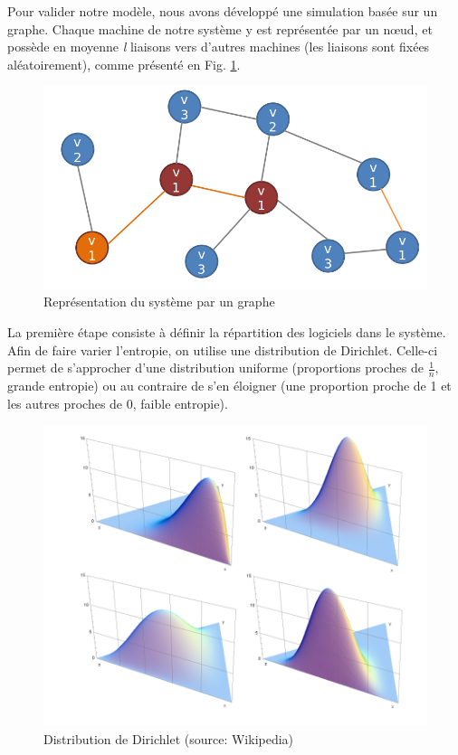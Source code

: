 Pour valider notre modèle, nous avons développé une simulation basée sur un graphe.
Chaque machine de notre système y est représentée par un nœud, et possède en moyenne \textit{l} liaisons vers d'autres machines (les liaisons sont fixées aléatoirement), comme présenté en Fig. \ref{graph}.

\begin{figure}[!ht]
\centering
     \includegraphics[width=1.0\linewidth]{Paul/python/graph.png}
     \caption{Représentation du système par un graphe}
     \label{graph}
\end{figure}

La première étape consiste à définir la répartition des logiciels dans le système. Afin de faire varier l'entropie, on utilise une distribution de Dirichlet. Celle-ci permet de s'approcher d'une distribution uniforme (proportions proches de $\frac{1}{n}$, grande entropie) ou au contraire de s'en éloigner (une proportion proche de 1 et les autres proches de 0, faible entropie). 

\begin{figure}[!ht]
\centering
     \includegraphics[width=1.0\linewidth]{Paul/python/dirichlet.png}
     \caption{Distribution de Dirichlet (source: Wikipedia)}
     \label{dirichlet}
\end{figure}


